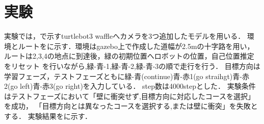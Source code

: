 \documentclass[10pt]{jarticle}
\begin{document}
    \section{実\hspace{2zw}験}%
    実験では，で示すturtlebot3 waffleへカメラを3つ追加したモデルを用いる．
    環境とルートをに示す．環境はgazebo上で作成した道幅が2.5mの十字路を用い，
    ルートは2,3,4の地点に到達後，緑の初期位置へロボットの位置，自己位置推定をリセット
    を行いながら,緑-青-1,緑-青-2,緑-青-3の順で走行を行う．
    目標方向は学習フェーズ，テストフェーズともに緑-青(continue)青-赤1(go straihgt)青-赤2(go left)青-赤3(go right)を入力している．
    step数は4000stepとした．
    実験条件はテストフェーズにおいて「壁に衝突せず,目標方向に対応したコースを選択」を成功，
     「目標方向とは異なったコースを選択する,または壁に衝突」を失敗とする．
    実験結果をに示す．
       
\end{document}
